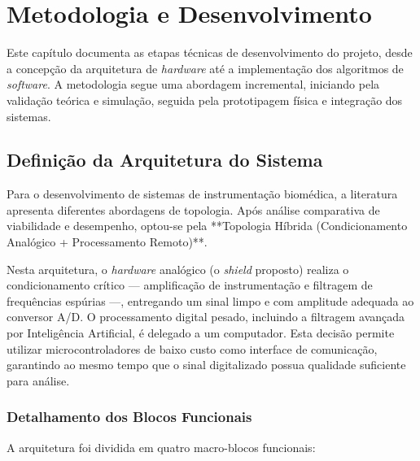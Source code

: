 \documentclass[tcc,capa]{texufpel}
\begin{document}

\chapter{Metodologia e Desenvolvimento}
\label{chap:desenvolvimento}

Este capítulo documenta as etapas técnicas de desenvolvimento do projeto, desde a concepção da arquitetura de \textit{hardware} até a implementação dos algoritmos de \textit{software}. A metodologia segue uma abordagem incremental, iniciando pela validação teórica e simulação, seguida pela prototipagem física e integração dos sistemas.

\section{Definição da Arquitetura do Sistema}

Para o desenvolvimento de sistemas de instrumentação biomédica, a literatura apresenta diferentes abordagens de topologia. Após análise comparativa de viabilidade e desempenho, optou-se pela **Topologia Híbrida (Condicionamento Analógico + Processamento Remoto)**.

Nesta arquitetura, o \textit{hardware} analógico (o \textit{shield} proposto) realiza o condicionamento crítico — amplificação de instrumentação e filtragem de frequências espúrias —, entregando um sinal limpo e com amplitude adequada ao conversor A/D. O processamento digital pesado, incluindo a filtragem avançada por Inteligência Artificial, é delegado a um computador. Esta decisão permite utilizar microcontroladores de baixo custo como interface de comunicação, garantindo ao mesmo tempo que o sinal digitalizado possua qualidade suficiente para análise.

\subsection{Detalhamento dos Blocos Funcionais}

A arquitetura foi dividida em quatro macro-blocos funcionais:
\end{document}
